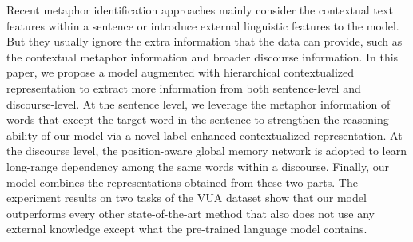 Recent metaphor identification approaches mainly consider the contextual text features within a sentence or introduce external linguistic features to the model. But they usually ignore the extra information that the data can provide, such as the contextual metaphor information and broader discourse information. In this paper, we propose a model augmented with hierarchical contextualized representation to extract more information from both sentence-level and discourse-level. At the sentence level, we leverage the metaphor information of words that except the target word in the sentence to strengthen the reasoning ability of our model via a novel label-enhanced contextualized representation. At the discourse level, the position-aware global memory network is adopted to learn long-range dependency among the same words within a discourse. Finally, our model combines the representations obtained from these two parts. The experiment results on two tasks of the VUA dataset show that our model outperforms every other state-of-the-art method that also does not use any external knowledge except what the pre-trained language model contains.
